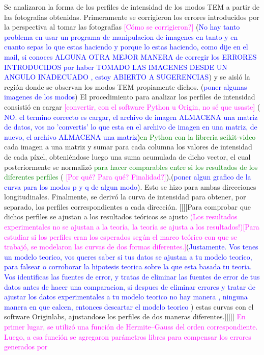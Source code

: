 \documentclass[10pt, a4paper]{article}%
\begin{document}
\begin{multicols}{2}
Se analizaron la forma de los perfiles de intensidad de los modos TEM a partir de las fotografias obtenidas. Primeramente se corrigieron los errores introducidos por la perspectiva al tomar las fotografías \textcolor{magenta}{[Cómo se corrigieron?]} (\textcolor{Blue}{No hay tanto problema en usar un programa de manipulacion de imagenes en tanto y en cuanto sepas lo que estas haciendo y porque lo estas haciendo, como dije en el mail, si conoces ALGUNA OTRA MEJOR MANERA de corregir los ERRORES INTRODUCIDOS por haber TOMADO LAS IMAGENES DESDE UN ANGULO INADECUADO , estoy ABIERTO A SUGERENCIAS}) y se aisló la región donde se observan los modos TEM propiamente dichos. (\textcolor{Blue}{poner algunas imagenes de los modos}) El procedimiento para analizar los perfiles de intensidad 
consistió en cargar \textcolor{magenta}{[convertir, con el software Python u Origin, no sé que usaste]} (\textcolor{Blue}{ NO. el termino correcto es cargar, el archivo de imagen ALMACENA una matriz de datos, vos no 'convertis' lo que esta en el archivo de imagen en una matriz, de nuevo, el archivo ALMACENA una matriz})\textcolor{Green}{en Python con la libreria scikit-video } cada imagen a una matriz y sumar para cada columna los valores de intensidad de cada píxel, obteniéndose luego una suma acumulada de dicho vector, el cual posteriormente se normalizó \textcolor{Green}{para hacer comparables entre si los resultados de los diferentes perfiles} ( \textcolor{magenta}{[Por qué? Para qué? Finalidad?]}).(\textcolor{Blue}{poner algun grafico de la curva para los modos p y q de algun modo}). Esto se hizo para ambas direcciones longitudinales. Finalmente, se derivó la curva de intensidad para obtener, por separado, los perfiles correspondientes a cada dirección. [[[[Para comprobar que dichos perfiles se ajustan a los resultados teóricos se ajusto \textcolor{magenta}{(Los resultados experimentales no se ajustan a la teoría, la teoría se ajusta a los resultados!)[Para estudiar si los perfiles eran los esperados según el marco teórico con que se trabajó, se modelaron las curvas de dos formas diferentes.]}(\textcolor{Blue}{Justamente. Vos tenes un modelo teorico, vos queres saber si tus datos se ajustan a tu modelo teorico, para falsear o corroborar la hipotesis teorica sobre la que esta basada tu teoria. Vos identificas las fuentes de error, y tratas de eliminar las fuentes de error de tus datos antes de hacer una comparacion, si despues de eliminar errores y tratar de ajustar los datos experimentales a tu modelo teorico no hay manera , ninguna manera en que calcen, entonces descartar el modelo teorico }) estas curvas con el software Originlabs, ajustandose los perfiles de dos maneras diferentes.]]]]] \textcolor{magenta}{En primer lugar, se utilizó una función de Hermite--Gauss del orden correspondiente. Luego, a esa función se agregaron parámetros libres para compensar los errores generados por
}
\end{multicols}
\end{document}
